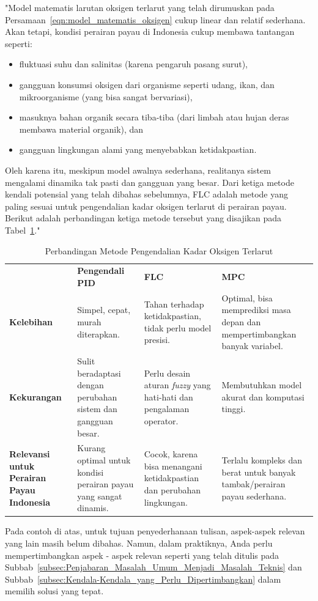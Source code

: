 "Model matematis larutan oksigen terlarut yang telah dirumuskan pada Persamaan~\ref{eqn:model_matematis_oksigen} cukup linear dan relatif sederhana. Akan tetapi, kondisi perairan payau di Indonesia cukup membawa tantangan seperti:
\begin{itemize}
    \item fluktuasi suhu dan salinitas (karena pengaruh pasang surut),
    \item gangguan konsumsi oksigen dari organisme seperti udang, ikan, dan mikroorganisme (yang bisa sangat bervariasi),
    \item masuknya bahan organik secara tiba-tiba (dari limbah atau hujan deras membawa material organik), dan
    \item gangguan lingkungan alami yang menyebabkan ketidakpastian.
\end{itemize}
Oleh karena itu, meskipun model awalnya sederhana, realitanya sistem mengalami dinamika tak pasti dan gangguan yang besar. Dari ketiga metode kendali potensial yang telah dibahas sebelumnya, FLC adalah metode yang paling sesuai untuk pengendalian kadar oksigen terlarut di perairan payau. Berikut adalah perbandingan ketiga metode tersebut yang disajikan pada Tabel~\ref{tab:Ch05_perbandingan_dan_pemilihan_metode_kendali}."
\begin{longtable}{|p{3cm}|p{3.5cm}|p{3.5cm}|p{3.5cm}|}
    \caption{Perbandingan Metode Pengendalian Kadar Oksigen Terlarut} 
    \label{tab:Ch05_perbandingan_dan_pemilihan_metode_kendali}
    \vspace{-.75em}\\
    \hline
     & \textbf{Pengendali PID} & \textbf{FLC} & \textbf{MPC} \\ \hline
    \centering \textbf{Kelebihan} & Simpel, cepat, murah diterapkan. & Tahan terhadap ketidakpastian, tidak perlu model presisi. & Optimal, bisa memprediksi masa depan dan mempertimbangkan banyak variabel. \\ \hline
    \centering \textbf{Kekurangan} & Sulit beradaptasi dengan perubahan sistem dan gangguan besar. & Perlu desain aturan \textit{fuzzy} yang hati-hati dan pengalaman operator. & Membutuhkan model akurat dan komputasi tinggi. \\ \hline
    \centering \textbf{Relevansi untuk Perairan Payau Indonesia} & Kurang optimal untuk kondisi perairan payau yang sangat dinamis. & Cocok, karena bisa menangani ketidakpastian dan perubahan lingkungan. & Terlalu kompleks dan berat untuk banyak tambak/perairan payau sederhana. \\ \hline
\end{longtable}
\vspace{12pt}

Pada contoh di atas, untuk tujuan penyederhanaan tulisan, aspek-aspek relevan yang lain masih belum dibahas. Namun, dalam praktiknya, Anda perlu mempertimbangkan aspek - aspek relevan seperti yang telah ditulis pada Subbab~\ref{subsec:Penjabaran_Masalah_Umum_Menjadi_Masalah_Teknis} dan Subbab~\ref{subsec:Kendala-Kendala_yang_Perlu_Dipertimbangkan} dalam memilih solusi yang tepat.

